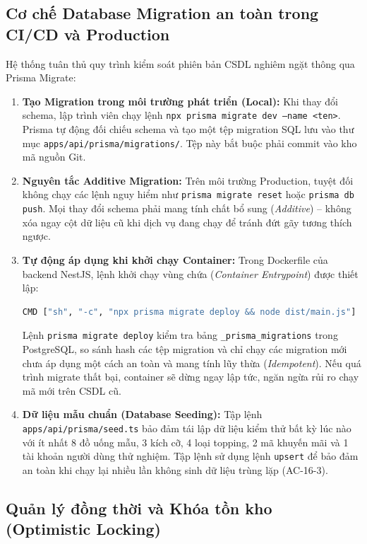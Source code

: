 \documentclass[11pt, a4paper]{article}
\begin{document}
\subsection{Cơ chế Database Migration an toàn trong CI/CD và Production}

Hệ thống tuân thủ quy trình kiểm soát phiên bản CSDL nghiêm ngặt thông qua Prisma Migrate:
\begin{enumerate}
	\item \textbf{Tạo Migration trong môi trường phát triển (Local):} Khi thay đổi schema, lập trình viên chạy lệnh \texttt{npx prisma migrate dev --name <ten>}. Prisma tự động đối chiếu schema và tạo một tệp migration SQL lưu vào thư mục \texttt{apps/api/prisma/migrations/}. Tệp này bắt buộc phải commit vào kho mã nguồn Git.
	\item \textbf{Nguyên tắc Additive Migration:} Trên môi trường Production, tuyệt đối không chạy các lệnh nguy hiểm như \texttt{prisma migrate reset} hoặc \texttt{prisma db push}. Mọi thay đổi schema phải mang tính chất bổ sung (\textit{Additive}) -- không xóa ngay cột dữ liệu cũ khi dịch vụ đang chạy để tránh đứt gãy tương thích ngược.
	\item \textbf{Tự động áp dụng khi khởi chạy Container:} Trong Dockerfile của backend NestJS, lệnh khởi chạy vùng chứa (\textit{Container Entrypoint}) được thiết lập:
	      \begin{lstlisting}[language=bash]
CMD ["sh", "-c", "npx prisma migrate deploy && node dist/main.js"]
  \end{lstlisting}
	      Lệnh \texttt{prisma migrate deploy} kiểm tra bảng \texttt{\_prisma\_migrations} trong PostgreSQL, so sánh hash các tệp migration và chỉ chạy các migration mới chưa áp dụng một cách an toàn và mang tính lũy thừa (\textit{Idempotent}). Nếu quá trình migrate thất bại, container sẽ dừng ngay lập tức, ngăn ngừa rủi ro chạy mã mới trên CSDL cũ.
	\item \textbf{Dữ liệu mẫu chuẩn (Database Seeding):} Tập lệnh \texttt{apps/api/prisma/seed.ts} bảo đảm tái lập dữ liệu kiểm thử bất kỳ lúc nào với ít nhất 8 đồ uống mẫu, 3 kích cỡ, 4 loại topping, 2 mã khuyến mãi và 1 tài khoản người dùng thử nghiệm. Tập lệnh sử dụng lệnh \texttt{upsert} để bảo đảm an toàn khi chạy lại nhiều lần không sinh dữ liệu trùng lặp (AC-16-3).
\end{enumerate}

\subsection{Quản lý đồng thời và Khóa tồn kho (Optimistic Locking)}
\end{document}
